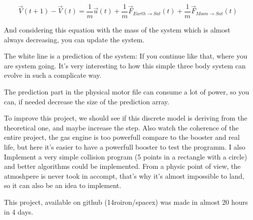 \documentclass{scrartcl}
\begin{document}
$$\vec V(t+1) - \vec V(t)=\frac{1}{m}\vec u(t)+ \frac{1}{m}\vec F_{Earth \rightarrow Sat}(t) + \frac{1}{m}\vec F _{Moon \rightarrow Sat}(t)$$

And considering this equation with the mass of the system which is almost always decreasing, you can update the system.

The white line is a prediction of the system: If you continue like that, where you are system going. It's very interesting to how this simple three body system can evolve in such a complicate way.

The prediction part in the physical motor file can consume a lot of power, so you can, if needed decrease the size of the prediction array.

To improve this project, we should see if this discrete model is deriving from the theoretical one, and maybe increase the step. Also watch the coherence of the entire project, the gas engine is too powerfull compare to the booster and real life, but here it's easier to have a powerfull booster to test the programm.
I also Implement a very simple collision program (5 points in a rectangle with a circle) and better algorithms could be implemented. From a physic point of view, the atmoshpere is never took in accompt, that's why it's almost impossible to land, so it can also be an idea to implement.

This project, available on github (14roiron/spacex) was made in almost 20 hours in 4 days.
\end{document}
